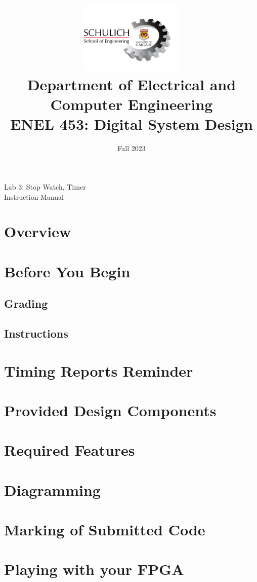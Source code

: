 \documentclass{article}
\title{
  \includegraphics[width=5cm]{Images/Logo.png}\\
  \normalsize Department of Electrical and Computer Engineering\\
  ENEL 453: Digital System Design
}
\date{Fall 2023}
\makeatletter
\renewcommand{\maketitle}{%
  \begin{center}
    {\@title}
    \vspace{1cm} %
    {\@date}
  \end{center}
}
\makeatother
\begin{document}
\centering

\maketitle
\large Lab 3: Stop Watch, Timer  \\
Instruction Manual

\RaggedRight
\section{Overview}


\section{Before You Begin}
    \subsection{Grading}
        
    \subsection{Instructions}
        

\section{Timing Reports Reminder}
    
\section{Provided Design Components}
    
\section{Required Features}
    
\section{Diagramming}
    
\section{Marking of Submitted Code}
    
\section{Playing with your FPGA}

\end{document}
